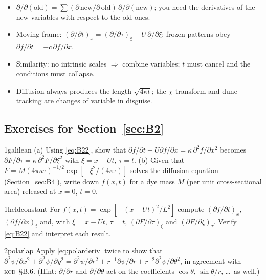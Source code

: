 \documentclass[11pt,letterpaper]{article}
\numberwithin{equation}{section}
\newcommand{\Kundu}{\textnormal{\textsc{kcd}}}   %
\begin{document}
\begin{remember}
\begin{itemize}
  \item $\partial/\partial(\text{old})=\sum(\partial\,\text{new}/\partial\,\text{old})\,\partial/\partial(\text{new})$; you need the
        derivatives of the new variables with respect to the old ones.
  \item Moving frame: $(\partial/\partial t)_x=(\partial/\partial\tau)_\xi-U\,\partial/\partial\xi$; frozen patterns obey
        $\partial f/\partial t=-c\,\partial f/\partial x$.
  \item Similarity: no intrinsic scales $\Rightarrow$ combine variables; $t$ must cancel and the conditions must collapse.
  \item Diffusion always produces the length $\sqrt{4\kappa t}$; the $\chi$ transform and dune tracking are changes of
        variable in disguise.
\end{itemize}
\end{remember}

\subsection*{Exercises for Section~\ref{sec:B2}}

\begin{exercise}{1}{galilean}
(a) Using \eqref{eq:B22}, show that $\partial f/\partial t+U\partial f/\partial x=\kappa\,\partial^2f/\partial x^2$ becomes
$\partial F/\partial\tau=\kappa\,\partial^2F/\partial\xi^2$ with $\xi=x-Ut$, $\tau=t$.
(b) Given that $F=M(4\pi\kappa\tau)^{-1/2}\exp[-\xi^2/(4\kappa\tau)]$ solves the diffusion equation (Section~\ref{sec:B4}),
write down $f(x,t)$ for a dye mass $M$ (per unit cross-sectional area) released at $x=0$, $t=0$.
\end{exercise}

\begin{exercise}{1}{heldconstant}
For $f(x,t)=\exp[-(x-Ut)^2/L^2]$ compute $(\partial f/\partial t)_x$, $(\partial f/\partial x)_t$ and, with $\xi=x-Ut$, $\tau=t$,
$(\partial F/\partial\tau)_\xi$ and $(\partial F/\partial\xi)_\tau$. Verify \eqref{eq:B22} and interpret each result.
\end{exercise}

\begin{exercise}{2}{polarlap}
Apply \eqref{eq:polarderiv} twice to show that
$\partial^2\psi/\partial x^2+\partial^2\psi/\partial y^2=\partial^2\psi/\partial r^2+r^{-1}\partial\psi/\partial r+r^{-2}\partial^2\psi/\partial\theta^2$,
in agreement with \Kundu\ \S B.6. (Hint: $\partial/\partial r$ and $\partial/\partial\theta$ act on the coefficients
$\cos\theta$, $\sin\theta/r$, \dots\ as well.)
\end{exercise}
\end{document}
